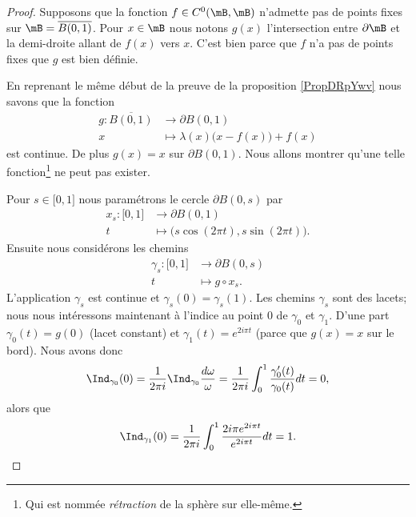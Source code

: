 \begin{proof}
    Supposons que la fonction \( f\in C^0(\mB,\mB)\) n'admette pas de points fixes sur \( \mB=\overline{ B(0,1) }\). Pour \( x\in \mB\) nous notons \( g(x)\) l'intersection entre \( \partial \mB\) et la demi-droite allant de \( f(x)\) vers \( x\). C'est bien parce que \( f\) n'a pas de points fixes que \( g\) est bien définie.

    En reprenant le même début de la preuve de la proposition \ref{PropDRpYwv} nous savons que la fonction
    \begin{equation}
        \begin{aligned}
            g\colon \overline{ B(0,1) }&\to \partial B(0,1) \\
            x&\mapsto \lambda(x)\big( x-f(x) \big)+f(x) 
        \end{aligned}
    \end{equation}
    est continue. De plus \( g(x)=x\) sur \( \partial B(0,1)\). Nous allons montrer qu'une telle fonction\footnote{Qui est nommée \emph{rétraction} de la sphère sur elle-même.} ne peut pas exister.

    Pour \( s\in\mathopen[ 0 , 1 \mathclose]\) nous paramétrons le cercle \( \partial B(0,s)\) par
    \begin{equation}
        \begin{aligned}
            x_s\colon \mathopen[ 0 , 1 \mathclose]&\to \partial B(0,1) \\
            t&\mapsto \big( s\cos(2\pi t),s\sin(2\pi t) \big). 
        \end{aligned}
    \end{equation}
    Ensuite nous considérons les chemins
    \begin{equation}
        \begin{aligned}
            \gamma_s\colon \mathopen[ 0 , 1 \mathclose]&\to \partial B(0,s) \\
            t&\mapsto g\circ x_s. 
        \end{aligned}
    \end{equation}
    L'application \( \gamma_s\) est continue et \( \gamma_s(0)=\gamma_s(1)\). Les chemins \( \gamma_s\) sont des lacets; nous nous intéressons maintenant à l'indice au point \( 0\) de \( \gamma_0\) et \( \gamma_1\). D'une part \( \gamma_0(t)=g(0)\) (lacet constant) et \( \gamma_1(t)= e^{2i\pi t}\) (parce que \( g(x)=x\) sur le bord). Nous avons donc
    \begin{equation}
        \Ind_{\gamma_0}(0)=\frac{1}{ 2\pi i }\Ind_{\gamma_0}\frac{ d\omega }{ \omega }=\frac{1}{ 2\pi i }\int_0^1\frac{ \gamma_0'(t) }{ \gamma_0(t) }dt=0,
    \end{equation}
    alors que
    \begin{equation}
        \Ind_{\gamma_1}(0)=\frac{1}{ 2\pi i }\int_0^1\frac{ 2i\pi e^{2i\pi t} }{  e^{2i\pi t} }dt=1.
    \end{equation}
    

\end{proof}
